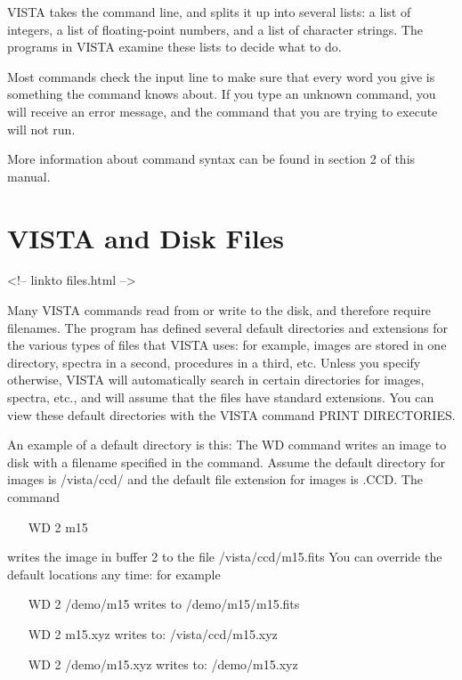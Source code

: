 VISTA takes the command line, and splits it up into several lists: a list
of integers, a list of floating-point numbers, and a list of character
strings.  The programs in VISTA examine these lists to decide what to do.

Most commands check the input line to make sure that every word you give is
something the command knows about.  If you type an unknown command, you
will receive an error message, and the command that you are trying to
execute will not run.

More information about command syntax can be found in section 2 of this
manual.

\section{VISTA and Disk Files}
\begin{rawhtml}
<!-- linkto files.html -->
\end{rawhtml}


Many VISTA commands read from or write to the disk, and therefore require
filenames. The program has defined several default directories and
extensions for the various types of files that VISTA uses: for example,
images are stored in one directory, spectra in a second, procedures in a
third, etc. Unless you specify otherwise, VISTA will automatically search
in certain directories for images, spectra, etc., and will assume that the
files have standard extensions.  You can view these default directories
with the VISTA command PRINT DIRECTORIES.

An example of a default directory is this: The WD command writes an image
to disk with a filename specified in the command.  Assume the default
directory for images is /vista/ccd/ and the default file extension for
images is .CCD.  The command
\begin{itemize}
   \item[WD 2 m15\hfill]{}
\end{itemize}
writes the image in buffer 2 to the file /vista/ccd/m15.fits You can
override the default locations any time: for example
\begin{itemize}
   \item[WD 2 /demo/m15\hfill]{writes to /demo/m15/m15.fits}
   \item[WD 2 m15.xyz\hfill]{writes to: /vista/ccd/m15.xyz}
   \item[WD 2 /demo/m15.xyz\hfill]{writes to: /demo/m15.xyz}
\end{itemize}

